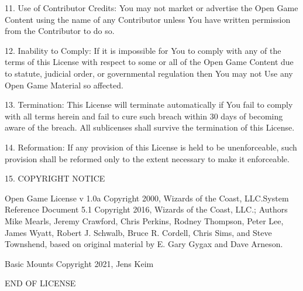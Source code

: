 \documentclass[letterpaper,twocolumn,openany,nodeprecatedcode]{dndbook}
\begin{document}
11. Use of Contributor Credits: You may not market or advertise the Open Game Content using the name of any Contributor unless You have written permission from the Contributor to do so.

12. Inability to Comply: If it is impossible for You to comply with any of the terms of this License with respect to some or all of the Open Game Content due to statute, judicial order, or governmental regulation then You may not Use any Open Game Material so affected.

13. Termination: This License will terminate automatically if You fail to comply with all terms herein and fail to cure such breach within 30 days of becoming aware of the breach. All sublicenses shall survive the termination of this License.

14. Reformation: If any provision of this License is held to be unenforceable, such provision shall be reformed only to the extent necessary to make it enforceable.

15. COPYRIGHT NOTICE

    Open Game License v 1.0a Copyright 2000, Wizards of the Coast, LLC.System Reference Document 5.1 Copyright 2016, Wizards of the Coast, LLC.; Authors Mike Mearls, Jeremy Crawford, Chris Perkins, Rodney Thompson, Peter Lee, James Wyatt, Robert J. Schwalb, Bruce R. Cordell, Chris Sims, and Steve Townshend, based on original material by E. Gary Gygax and Dave Arneson.

    Basic Mounts Copyright 2021, Jens Keim

END OF LICENSE
\end{document}
